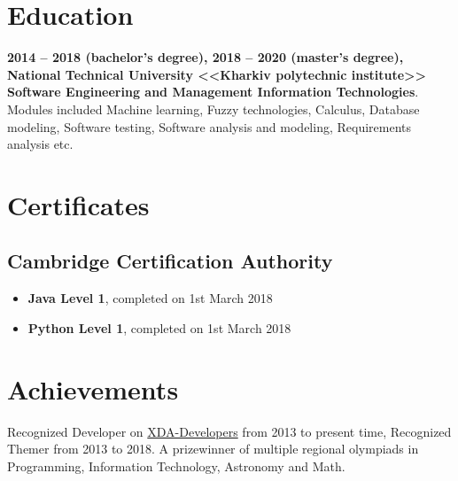 \documentclass[a4paper]{article}
\begin{document}
	\section*{Education}
	\textbf{2014 -- 2018 (bachelor's degree), 2018 -- 2020 (master's degree), National Technical University <<Kharkiv polytechnic institute>> Software Engineering and Management Information Technologies}. \\
	Modules included Machine learning, Fuzzy technologies, Calculus, Database modeling, Software testing, Software analysis and modeling, Requirements analysis etc.
	
	\section*{Certificates}
	\subsection*{Cambridge Certification Authority}
	\begin{itemize}
		\item \textbf{Java Level 1}, completed on 1st March 2018
		\item \textbf{Python Level 1}, completed on 1st March 2018
	\end{itemize}

	\section*{Achievements}
	Recognized Developer on \href{https://forum.xda-developers.com/member.php?u=3685328}{XDA-Developers} from 2013 to present time, Recognized Themer from 2013 to 2018.
	A prizewinner of multiple regional olympiads in Programming, Information Technology, Astronomy and Math.
\end{document}
